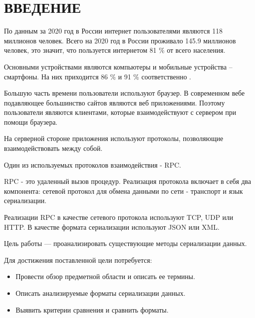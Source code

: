 \chapter*{ВВЕДЕНИЕ}

По данным за 2020 год в России интернет пользователями являются 118 миллионов человек. Всего на 2020 год в России проживало 145.9 миллионов человек, это значит, что пользуется интернетом 81 \% от всего населения.  

Основными устройствами являются компьютеры и мобильные устройства -- смартфоны. На них приходится 86 \% и 91 \% соответственно \cite{russian-users-stat}.

Большую часть времени пользователи используют браузер.
В современном вебе подавляющее большинство сайтов являются веб приложениями. Поэтому пользователи являются клиентами, которые взаимодействуют с сервером при помощи браузера.

На серверной стороне приложения используют протоколы, позволяющие взаимодействовать между собой. 

Один из используемых протоколов взаимодействия - RPC.

RPC - это удаленный вызов процедур. Реализация протокола включает в себя два компонента: сетевой протокол для обмена данными по сети - транспорт и язык сериализации.  

Реализации RPC в качестве сетевого протокола используют TCP, UDP или HTTP.  
В качестве формата сериализации используют JSON или XML.

Цель работы --- проанализировать существующие методы сериализации данных.

Для достижения поставленной цели потребуется:
\begin{itemize}
\item Провести обзор предметной области и описать ее термины.
\item Описать анализируемые форматы сериализации данных.
\item Выявить критерии сравнения и сравнить форматы.
\end{itemize}

